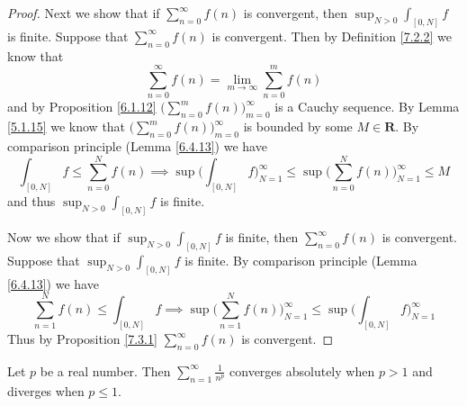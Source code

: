 \begin{proof}
    Next we show that if \(\sum_{n = 0}^\infty f(n)\) is convergent, then \(\sup_{N > 0} \int_{[0, N]} f\) is finite.
    Suppose that \(\sum_{n = 0}^\infty f(n)\) is convergent.
    Then by Definition \ref{7.2.2} we know that
    \[
        \sum_{n = 0}^\infty f(n) = \lim_{m \to \infty} \sum_{n = 0}^m f(n)
    \]
    and by Proposition \ref{6.1.12} \(\big(\sum_{n = 0}^m f(n)\big)_{m = 0}^\infty\) is a Cauchy sequence.
    By Lemma \ref{5.1.15} we know that \(\big(\sum_{n = 0}^m f(n)\big)_{m = 0}^\infty\) is bounded by some \(M \in \mathbf{R}\).
    By comparison principle (Lemma \ref{6.4.13}) we have
    \[
        \int_{[0, N]} f \leq \sum_{n = 0}^N f(n) \implies \sup\bigg(\int_{[0, N]} f\bigg)_{N = 1}^\infty \leq \sup\bigg(\sum_{n = 0}^N f(n)\bigg)_{N = 1}^\infty \leq M
    \]
    and thus \(\sup_{N > 0} \int_{[0, N]} f\) is finite.

    Now we show that if \(\sup_{N > 0} \int_{[0, N]} f\) is finite, then \(\sum_{n = 0}^\infty f(n)\) is convergent.
    Suppose that \(\sup_{N > 0} \int_{[0, N]} f\) is finite.
    By comparison principle (Lemma \ref{6.4.13}) we have
    \[
        \sum_{n = 1}^N f(n) \leq \int_{[0, N]} f \implies \sup\bigg(\sum_{n = 1}^N f(n)\bigg)_{N = 1}^\infty \leq \sup\bigg(\int_{[0, N]} f\bigg)_{N = 1}^\infty
    \]
    Thus by Proposition \ref{7.3.1} \(\sum_{n = 0}^\infty f(n)\) is convergent.
\end{proof}

\begin{corollary}\label{11.6.5}
    Let \(p\) be a real number.
    Then \(\sum_{n = 1}^\infty \frac{1}{n^p}\) converges absolutely when \(p > 1\) and diverges when \(p \leq 1\).
\end{corollary}

